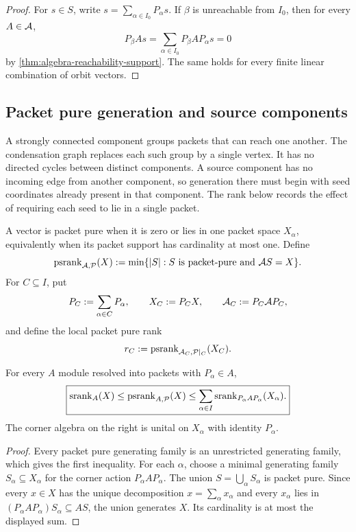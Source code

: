 \begin{proof}
For $s\in S$, write $s=\sum_{\alpha\in I_0}P_\alpha s$.  If $\beta$ is unreachable from $I_0$, then for every $A\in\mathcal A$,
\[
P_\beta As
=
\sum_{\alpha\in I_0}P_\beta AP_\alpha s
=0
\]
by \cref{thm:algebra-reachability-support}.  The same holds for every finite linear combination of orbit vectors.
\end{proof}

\subsection{Packet pure generation and source components}
A strongly connected component groups packets that can reach one another.  The condensation graph replaces each such group by a single vertex.  It has no directed cycles between distinct components.  A source component has no incoming edge from another component, so generation there must begin with seed coordinates already present in that component.  The rank below records the effect of requiring each seed to lie in a single packet.

\begin{definition}
\label{def:directed-seed-rank}
A vector is packet pure when it is zero or lies in one packet space $X_\alpha$, equivalently when its packet support has cardinality at most one.  Define
\[
\operatorname{psrank}_{\mathcal A,\mathcal P}(X)
:=
\min\{|S|:S\text{ is packet-pure and }\mathcal A S=X\}.
\]
For $C\subseteq I$, put
\[
P_C:=\sum_{\alpha\in C}P_\alpha,
\qquad
X_C:=P_CX,
\qquad
\mathcal A_C:=P_C\mathcal A P_C,
\]
and define the local packet pure rank
\[
r_C:=\operatorname{psrank}_{\mathcal A_C,\mathcal P|_C}(X_C).
\]
\end{definition}

\begin{proposition}
\label{prop:packet-pure-rank-bounds}
For every $A$ module resolved into packets with $P_\alpha\in A$,
\[
\boxed{
\operatorname{srank}_A(X)
\leq
\operatorname{psrank}_{A,\mathcal P}(X)
\leq
\sum_{\alpha\in I}
\operatorname{srank}_{P_\alpha A P_\alpha}(X_\alpha).
}
\]
The corner algebra on the right is unital on $X_\alpha$ with identity $P_\alpha$.
\end{proposition}

\begin{proof}
Every packet pure generating family is an unrestricted generating family, which gives the first inequality.  For each $\alpha$, choose a minimal generating family $S_\alpha\subseteq X_\alpha$ for the corner action $P_\alpha A P_\alpha$.  The union $S=\bigcup_\alpha S_\alpha$ is packet pure.  Since every $x\in X$ has the unique decomposition $x=\sum_\alpha x_\alpha$ and every $x_\alpha$ lies in $(P_\alpha A P_\alpha)S_\alpha\subseteq AS$, the union generates $X$.  Its cardinality is at most the displayed sum.
\end{proof}


